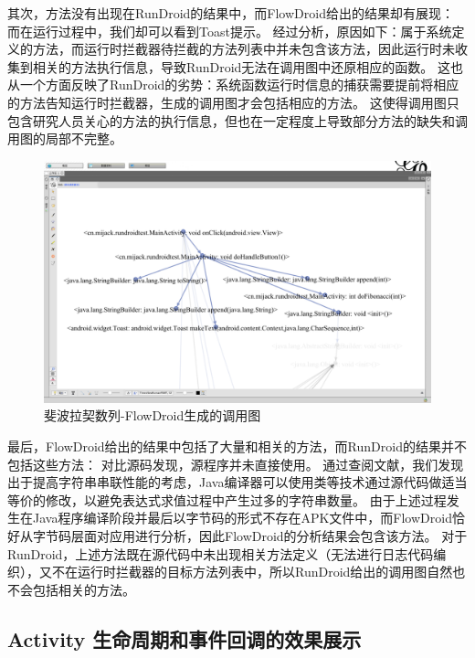 其次，方法没有出现在RunDroid的结果中，而FlowDroid给出的结果却有展现：
而在运行过程中，我们却可以看到Toast提示。
经过分析，原因如下：属于系统定义的方法，而运行时拦截器待拦截的方法列表中并未包含该方法，因此运行时未收集到相关的方法执行信息，导致RunDroid无法在调用图中还原相应的函数。
这也从一个方面反映了RunDroid的劣势：系统函数运行时信息的捕获需要提前将相应的方法告知运行时拦截器，生成的调用图才会包括相应的方法。
这使得调用图只包含研究人员关心的方法的执行信息，但也在一定程度上导致部分方法的缺失和调用图的局部不完整。


\begin{figure}[!ht]
	\centering
	\includegraphics[width=\textwidth]{./Figures/FlowDroid-Fibonacci.png}
	\caption{斐波拉契数列-FlowDroid生成的调用图}
	\label{fig:flowdroid-result-Fibonacci}
\end{figure}


最后，FlowDroid给出的结果中包括了大量和相关的方法，而RunDroid的结果并不包括这些方法：
对比源码发现，源程序并未直接使用。
通过查阅文献\cite{gosling2000java}，我们发现出于提高字符串串联性能的考虑，Java编译器可以使用类等技术通过源代码做适当等价的修改，以避免表达式求值过程中产生过多的字符串数量。
由于上述过程发生在Java程序编译阶段并最后以字节码的形式不存在APK文件中，而FlowDroid恰好从字节码层面对应用进行分析，因此FlowDroid的分析结果会包含该方法。
对于RunDroid，上述方法既在源代码中未出现相关方法定义（无法进行日志代码编织），又不在运行时拦截器的目标方法列表中，所以RunDroid给出的调用图自然也不会包括相关的方法。



\subsection{Activity 生命周期和事件回调的效果展示}

